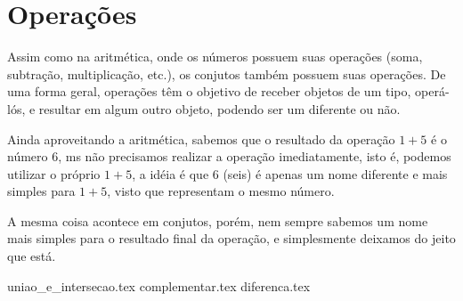\section{Operações}
Assim como na aritmética, onde os números possuem suas operações (soma, subtração,  multiplicação, etc.), os conjutos também possuem suas operações.
De uma forma geral, operações têm o objetivo de receber objetos de um tipo, operá-lós, e resultar em algum outro objeto, podendo ser um diferente ou não.

Ainda aproveitando a aritmética, sabemos que o resultado da operação $1 + 5$ é o número $6$, ms não precisamos realizar a operação imediatamente, isto é, podemos utilizar o próprio $1 + 5$, a idéia é que $6$ (seis) é apenas um nome diferente e mais simples para $1 + 5$, visto que representam o mesmo número.

A mesma coisa acontece em conjutos, porém, nem sempre sabemos um nome mais simples para o resultado final da operação, e simplesmente deixamos do jeito que está.


{uniao_e_intersecao.tex}
{complementar.tex}
{diferenca.tex}

